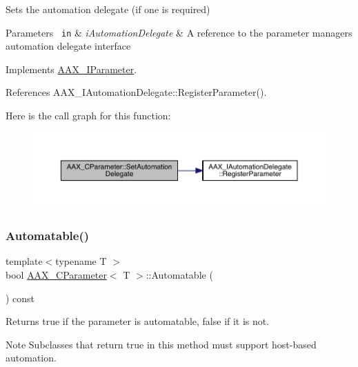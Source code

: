 Sets the automation delegate (if one is required) 


\begin{DoxyParams}[1]{Parameters}
\mbox{\texttt{ in}}  & {\em i\+Automation\+Delegate} & A reference to the parameter manager\textquotesingle{}s automation delegate interface \\
\hline
\end{DoxyParams}


Implements \mbox{\hyperlink{a01857_a2c3dfdce09a2652f954ea6e4f9e12797}{A\+A\+X\+\_\+\+I\+Parameter}}.



References A\+A\+X\+\_\+\+I\+Automation\+Delegate\+::\+Register\+Parameter().

Here is the call graph for this function\+:
\nopagebreak
\begin{figure}[H]
\begin{center}
\leavevmode
\includegraphics[width=350pt]{a01537_aceb34aeadaca054f318004d49a0bd5b7_cgraph}
\end{center}
\end{figure}
\mbox{\label{a01537_aebb304bbabf739d5019bd6372e8928d7}} 
\subsubsection{\texorpdfstring{Automatable()}{Automatable()}}
{\footnotesize\ttfamily template$<$typename T $>$ \\
bool \mbox{\hyperlink{a01537}{A\+A\+X\+\_\+\+C\+Parameter}}$<$ T $>$\+::Automatable (\begin{DoxyParamCaption}{ }\end{DoxyParamCaption}) const\hspace{0.3cm}{\ttfamily [virtual]}}



Returns true if the parameter is automatable, false if it is not. 

\begin{DoxyNote}{Note}
Subclasses that return true in this method must support host-\/based automation. 
\end{DoxyNote}


